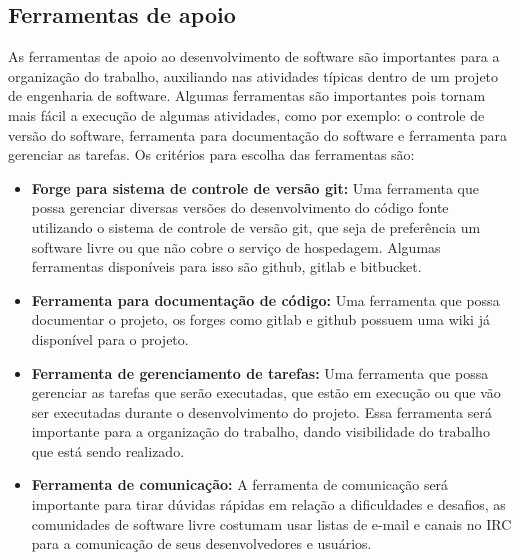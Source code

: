 \subsection{Ferramentas de apoio}

As ferramentas de apoio ao desenvolvimento de software são importantes para a
organização do trabalho, auxiliando nas atividades típicas dentro de um projeto
de engenharia de software. Algumas ferramentas são importantes pois tornam mais fácil
a execução de algumas atividades, como por exemplo: o controle de versão do software,
ferramenta para documentação do software e ferramenta para gerenciar as tarefas.
Os critérios para escolha das ferramentas são:

\begin{itemize}
  \item \textbf{Forge para sistema de controle de versão git:} Uma ferramenta que
  possa gerenciar diversas versões do desenvolvimento do código fonte utilizando
  o sistema de controle de versão git, que seja de preferência um software livre
  ou que não cobre o serviço de hospedagem. Algumas ferramentas disponíveis para
  isso são github, gitlab e bitbucket.
  \item \textbf{Ferramenta para documentação de código:} Uma ferramenta que possa
  documentar o projeto, os forges como gitlab e github possuem uma wiki já disponível
  para o projeto.
  \item \textbf{Ferramenta de gerenciamento de tarefas:} Uma ferramenta que possa
  gerenciar as tarefas que serão executadas, que estão em execução ou que vão ser executadas
  durante o desenvolvimento do projeto. Essa ferramenta será importante para a
  organização do trabalho, dando visibilidade do trabalho que está sendo realizado.
  \item \textbf{Ferramenta de comunicação:} A ferramenta de comunicação será
  importante para tirar dúvidas rápidas em relação a dificuldades e desafios, as
  comunidades de software livre costumam usar listas de e-mail e canais no IRC
  para a comunicação de seus desenvolvedores e usuários.
\end{itemize}

